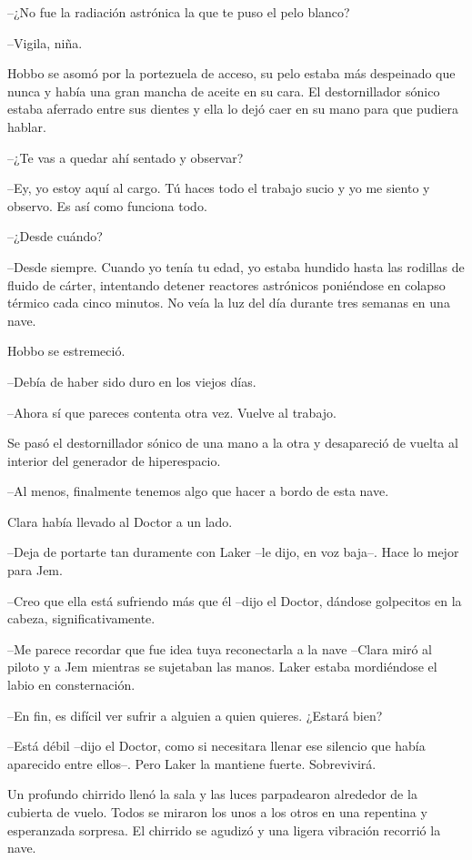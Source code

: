 {--¿No fue la radiación astrónica la que te puso el pelo blanco?}

{--Vigila, niña.}

{Hobbo se asomó por la portezuela de acceso, su pelo estaba más
 despeinado que nunca y había una gran mancha de aceite en su cara. El
 destornillador sónico estaba aferrado entre sus dientes y ella lo dejó
caer en su mano para que pudiera hablar.}

{--¿Te vas a quedar ahí sentado y observar?}

{--Ey, yo estoy aquí al cargo. Tú haces todo el trabajo sucio y yo me
siento y observo. Es así como funciona todo.}

{--¿Desde cuándo?}

{--Desde siempre. Cuando yo tenía tu edad, yo estaba hundido hasta las
 rodillas de fluido de cárter, intentando detener reactores astrónicos
 poniéndose en colapso térmico cada cinco minutos. No veía la luz del día
durante tres semanas en una nave.}

{Hobbo se estremeció.}

{--Debía de haber sido duro en los viejos días.}

{--Ahora sí que pareces contenta otra vez. Vuelve al trabajo.}

{Se pasó el destornillador sónico de una mano a la otra y desapareció de
vuelta al interior del generador de hiperespacio.}

{--Al menos, finalmente tenemos algo que hacer a bordo de esta
 nave.}

{Clara había llevado al Doctor a un lado.}

{--Deja de portarte tan duramente con Laker --le dijo, en voz baja--.
Hace lo mejor para Jem.}

{--Creo que ella está sufriendo más que él --dijo el Doctor, dándose
golpecitos en la cabeza, significativamente.}

{--Me parece recordar que fue idea tuya reconectarla a la nave --Clara
 miró al piloto y a Jem mientras se sujetaban las manos. Laker estaba
mordiéndose el labio en consternación.}

{--En fin, es difícil ver sufrir a alguien a quien quieres. ¿Estará
bien?}

{--Está débil --dijo el Doctor, como si necesitara llenar ese silencio
 que había aparecido entre ellos--. Pero Laker la mantiene fuerte.
Sobrevivirá.}

{Un profundo chirrido llenó la sala y las luces parpadearon alrededor de
 la cubierta de vuelo. Todos se miraron los unos a los otros en una
 repentina y esperanzada sorpresa. El chirrido se agudizó y una ligera
vibración recorrió la nave.}


